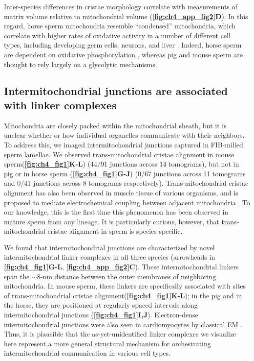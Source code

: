 Inter-species differences in cristae morphology correlate with measurements of matrix volume relative to mitochondrial volume (\textbf{\autoref{fig:ch4_app_fig2}D}). In this regard, horse sperm mitochondria resemble “condensed” mitochondria, which correlate with higher rates of oxidative activity in a number of different cell types, including developing germ cells, neurons, and liver \cite{DeMartino1979, Perkins2011, Hackenbrock1968}. Indeed, horse sperm are dependent on oxidative phosphorylation \cite{Davila2016}, whereas pig \cite{Marin2003} and mouse sperm \cite{Mukai2004, Odet2013} are thought to rely largely on a glycolytic mechanisms.%
%
\subsection*{Intermitochondrial junctions are associated with linker complexes}
Mitochondria are closely packed within the mitochondrial sheath, but it is unclear whether or how individual organelles communicate with their neighbors. To address this, we imaged intermitochondrial junctions captured in FIB-milled sperm lamellae. We observed trans-mitochondrial cristae alignment in mouse sperm\linebreak (\textbf{\autoref{fig:ch4_fig1}K-L}) (44/91 junctions across 14 tomograms), but not in pig or in horse sperm (\textbf{\autoref{fig:ch4_fig1}G-J}) (0/67 junctions across 11 tomograms and 0/41 junctions across 8 tomograms respectively). Trans-mitochondrial cristae alignment has also been observed in muscle tissue of various organisms, and is proposed to mediate electrochemical coupling between adjacent mitochondria \cite{Picard2015}. To our knowledge, this is the first time this phenomenon has been observed in mature sperm from any lineage. It is particularly curious, however, that trans-mitochondrial cristae alignment in sperm is species-specific.

We found that intermitochondrial junctions are characterized by novel intermitochondrial linker complexes in all three species (arrowheads in \textbf{\autoref{fig:ch4_fig1}G-L}, \textbf{\autoref{fig:ch4_app_fig2}C}). These intermitochondrial linkers span the $\sim$8-nm distance between the outer membranes of neighboring mitochondria. In mouse sperm, these linkers are specifically associated with sites of trans-mitochondrial cristae alignment\linebreak (\textbf{\autoref{fig:ch4_fig1}K-L}); in the pig and in the horse, they are positioned at regularly spaced intervals along intermitochondrial junctions (\textbf{\autoref{fig:ch4_fig1}I,J}). Electron-dense intermitochondrial junctions were also seen in cardiomyocytes by classical EM \cite{Huang2013, Picard2015, Duvert1985}. Thus, it is plausible that the as-yet-unidentified linker complexes we visualize here represent a more general structural mechanism for orchestrating intermitochondrial communication in various cell types.
%
